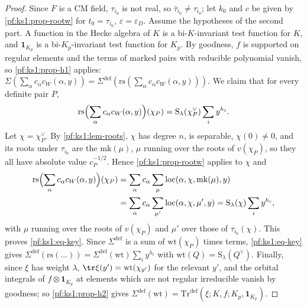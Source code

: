 \begin{proof}
Since $F$ is a CM field, $\tau_{i_0}$ is not real, so $\bar\tau_{i_0}\neq\tau_{i_0}$; let $k_0$ and $c$ be given by \cref{pf:ks1:prop-rootw} for
$t_0=\tau_{i_0}$, $\varepsilon=\varepsilon_D$. Assume the hypotheses of the second part. A function in the Hecke algebra of $K$ is a bi-$K$-invariant
test function for $K$, and $\mathbf 1_{K_p}$ is a bi-$K_p$-invariant test function for $K_p$. By goodness, $f$ is supported on regular elements
and the terms of marked pairs with reducible polynomial vanish, so \cref{pf:ks1:prop-h1} applies:
$\Sigma(\sum_\alpha c_\alpha c_W(\alpha,y))=\Sigma^{\mathrm{def}}(\mathrm{rs}(\sum_\alpha c_\alpha c_W(\alpha,y)))$. We claim that for every definite pair
$P$,
\begin{equation}\label{pf:ks1:eq-key}
\mathrm{rs}\Bigl(\sum_\alpha c_\alpha c_W(\alpha,y)\Bigr)(\chi_P)=\mathrm{S}_\lambda(\chi_P^\vee)\sum_iy^{h_i}.
\end{equation}
Let $\chi=\chi_P^\vee$. By \cref{pf:ks1:lem-roots}, $\chi$ has degree $n$, is separable, $\chi(0)\neq0$, and its roots under $\tau_{i_0}$ are the
$\mathrm{mk}(\mu)$, $\mu$ running over the roots of $v(\chi_P)$, so they all have absolute value $c_P^{-1/2}$. Hence \cref{pf:ks1:prop-rootw} applies
to $\chi$ and
\begin{align*}
\mathrm{rs}\Bigl(\sum_\alpha c_\alpha c_W(\alpha,y)\Bigr)(\chi_P)&=\sum_\alpha c_\alpha\sum_{\mu}\mathrm{loc}(\alpha,\chi,\mathrm{mk}(\mu),y)\\
&=\sum_\alpha c_\alpha\sum_{\mu'}\mathrm{loc}(\alpha,\chi,\mu',y)=\mathrm{S}_\lambda(\chi)\sum_iy^{h_i},
\end{align*}
with $\mu$ running over the roots of $v(\chi_P)$ and $\mu'$ over those of $\tau_{i_0}(\chi)$. This proves \eqref{pf:ks1:eq-key}. Since
$\Sigma^{\mathrm{def}}$ is a sum of $\mathrm{wt}(\chi_P)$ times terms, \eqref{pf:ks1:eq-key} gives
$\Sigma^{\mathrm{def}}(\mathrm{rs}(\dots))=\Sigma^{\mathrm{def}}(\mathrm{wt})\sum_iy^{h_i}$ with $\mathrm{wt}(Q)=\mathrm{S}_\lambda(Q^\vee)$. Finally,
since $\xi$ has weight $\lambda$, $\tr\xi(y')=\mathrm{wt}(\chi_{y'})$ for the relevant $y'$, and the orbital integrals of $f\otimes\mathbf 1_{K_p}$ at
elements which are not regular irreducible vanish by goodness; so \cref{pf:ks1:prop-h2} gives $\Sigma^{\mathrm{def}}(\mathrm{wt})=\mathrm{Tr}^{\mathrm{def}}(\xi;K,f;K_p,
\mathbf 1_{K_p})$.
\end{proof}


